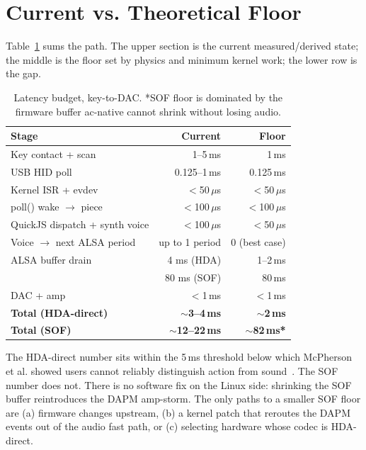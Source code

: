 \documentclass[10pt,letterpaper,twocolumn]{article}
\begin{document}

\section{Current vs. Theoretical Floor}
\label{sec:floor}

Table~\ref{tab:floor} sums the path. The upper section is the current measured/derived state; the middle is the floor set by physics and minimum kernel work; the lower row is the gap.

\begin{table}[h]
\small
\centering
\begin{tabular}{lrr}
\toprule
\textbf{Stage} & \textbf{Current} & \textbf{Floor} \\
\midrule
Key contact + scan & 1--5\,ms & 1\,ms \\
USB HID poll & 0.125--1\,ms & 0.125\,ms \\
Kernel ISR + evdev & $<$50\,$\mu$s & $<$50\,$\mu$s \\
poll() wake $\rightarrow$ piece & $<$100\,$\mu$s & $<$100\,$\mu$s \\
QuickJS dispatch + synth voice & $<$100\,$\mu$s & $<$50\,$\mu$s \\
Voice $\rightarrow$ next ALSA period & up to 1 period & 0 (best case) \\
ALSA buffer drain & 4 ms (HDA) & 1--2\,ms \\
                 & 80 ms (SOF) & 80\,ms \\
DAC + amp & $<$1\,ms & $<$1\,ms \\
\midrule
\textbf{Total (HDA-direct)} & \textbf{$\sim$3--4\,ms} & \textbf{$\sim$2\,ms} \\
\textbf{Total (SOF)} & \textbf{$\sim$12--22\,ms} & \textbf{$\sim$82\,ms*} \\
\bottomrule
\end{tabular}
\caption{Latency budget, key-to-DAC. *SOF floor is dominated by the firmware buffer ac-native cannot shrink without losing audio.}
\label{tab:floor}
\end{table}

The HDA-direct number sits within the 5\,ms threshold below which McPherson et al. showed users cannot reliably distinguish action from sound~\citep{mcpherson2016action}. The SOF number does not. There is no software fix on the Linux side: shrinking the SOF buffer reintroduces the DAPM amp-storm. The only paths to a smaller SOF floor are (a) firmware changes upstream, (b) a kernel patch that reroutes the DAPM events out of the audio fast path, or (c) selecting hardware whose codec is HDA-direct.
\end{document}
